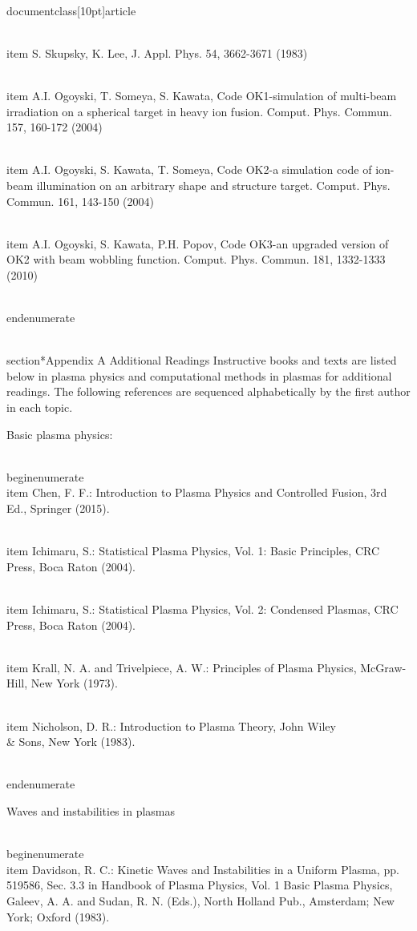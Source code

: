\\documentclass[10pt]{article}
\begin{document}
{{{{{{  \\item S. Skupsky, K. Lee, J. Appl. Phys. 54, 3662-3671 (1983)

  \\item A.I. Ogoyski, T. Someya, S. Kawata, Code OK1-simulation of multi-beam irradiation on a spherical target in heavy ion fusion. Comput. Phys. Commun. 157, 160-172 (2004)

  \\item A.I. Ogoyski, S. Kawata, T. Someya, Code OK2-a simulation code of ion-beam illumination on an arbitrary shape and structure target. Comput. Phys. Commun. 161, 143-150 (2004)

  \\item A.I. Ogoyski, S. Kawata, P.H. Popov, Code OK3-an upgraded version of OK2 with beam wobbling function. Comput. Phys. Commun. 181, 1332-1333 (2010)

\\end{enumerate}

\\section*{Appendix A Additional Readings}
Instructive books and texts are listed below in plasma physics and computational methods in plasmas for additional readings. The following references are sequenced alphabetically by the first author in each topic.

Basic plasma physics:

\\begin{enumerate}
  \\item Chen, F. F.: Introduction to Plasma Physics and Controlled Fusion, 3rd Ed., Springer (2015).

  \\item Ichimaru, S.: Statistical Plasma Physics, Vol. 1: Basic Principles, CRC Press, Boca Raton (2004).

  \\item Ichimaru, S.: Statistical Plasma Physics, Vol. 2: Condensed Plasmas, CRC Press, Boca Raton (2004).

  \\item Krall, N. A. and Trivelpiece, A. W.: Principles of Plasma Physics, McGraw-Hill, New York (1973).

  \\item Nicholson, D. R.: Introduction to Plasma Theory, John Wiley \\& Sons, New York (1983).

\\end{enumerate}

Waves and instabilities in plasmas

\\begin{enumerate}
  \\item Davidson, R. C.: Kinetic Waves and Instabilities in a Uniform Plasma, pp. 519586, Sec. 3.3 in Handbook of Plasma Physics, Vol. 1 Basic Plasma Physics, Galeev, A. A. and Sudan, R. N. (Eds.), North Holland Pub., Amsterdam; New York; Oxford (1983).

}}}}}}
\end{document}
